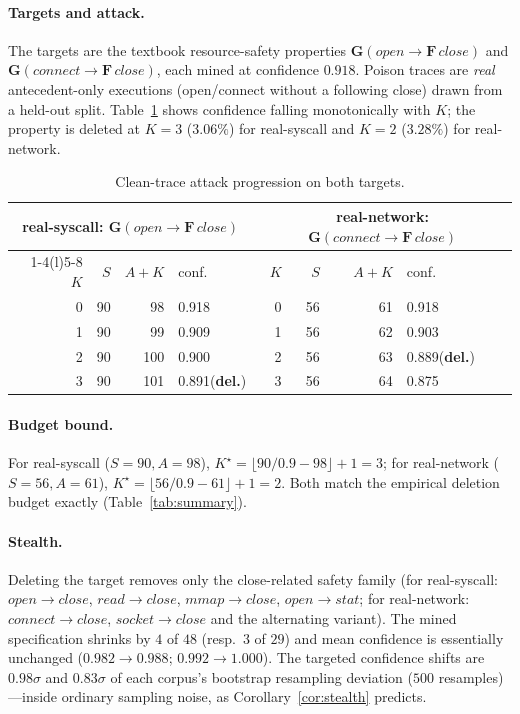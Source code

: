 \documentclass[runningheads]{llncs}
\begin{document}
\paragraph{Targets and attack.} The targets are the textbook resource-safety
properties $\mathbf{G}(\mathit{open}\!\rightarrow\!\mathbf{F}\,\mathit{close})$
and $\mathbf{G}(\mathit{connect}\!\rightarrow\!\mathbf{F}\,\mathit{close})$, each
mined at confidence $0.918$. Poison traces are \emph{real} antecedent-only
executions (open/connect without a following close) drawn from a held-out split.
Table~\ref{tab:attack} shows confidence falling monotonically with $K$; the
property is deleted at $K{=}3$ ($3.06\%$) for real-syscall and $K{=}2$ ($3.28\%$)
for real-network.

\begin{table}[t]
\centering
\caption{Clean-trace attack progression on both targets.}
\label{tab:attack}
\begin{tabular}{rrrl@{\qquad}rrrl}
\toprule
\multicolumn{4}{c}{real-syscall: $\mathbf{G}(\mathit{open}\!\to\!\mathbf{F}\,\mathit{close})$}
& \multicolumn{4}{c}{real-network: $\mathbf{G}(\mathit{connect}\!\to\!\mathbf{F}\,\mathit{close})$}\\
\cmidrule(r){1-4}\cmidrule(l){5-8}
$K$ & $S$ & $A{+}K$ & conf. & $K$ & $S$ & $A{+}K$ & conf. \\
\midrule
0 & 90 & 98  & 0.918 & 0 & 56 & 61 & 0.918 \\
1 & 90 & 99  & 0.909 & 1 & 56 & 62 & 0.903 \\
2 & 90 & 100 & 0.900 & 2 & 56 & 63 & 0.889\;(\textbf{del.}) \\
3 & 90 & 101 & 0.891\;(\textbf{del.}) & 3 & 56 & 64 & 0.875 \\
\bottomrule
\end{tabular}
\end{table}

\paragraph{Budget bound.} For real-syscall ($S{=}90,A{=}98$),
$K^\star=\lfloor 90/0.9-98\rfloor+1=3$; for real-network ($S{=}56,A{=}61$),
$K^\star=\lfloor 56/0.9-61\rfloor+1=2$. Both match the empirical deletion budget
exactly (Table~\ref{tab:summary}).

\paragraph{Stealth.} Deleting the target removes only the close-related safety
family (for real-syscall: $\mathit{open}{\to}\mathit{close}$,
$\mathit{read}{\to}\mathit{close}$, $\mathit{mmap}{\to}\mathit{close}$,
$\mathit{open}{\to}\mathit{stat}$; for real-network:
$\mathit{connect}{\to}\mathit{close}$, $\mathit{socket}{\to}\mathit{close}$ and
the alternating variant). The mined specification shrinks by $4$ of $48$
(resp.\ $3$ of $29$) and mean confidence is essentially unchanged
($0.982\!\to\!0.988$; $0.992\!\to\!1.000$). The targeted confidence shifts are
$0.98\sigma$ and $0.83\sigma$ of each corpus's bootstrap resampling deviation
($500$ resamples)---inside ordinary sampling noise, as
Corollary~\ref{cor:stealth} predicts.
\end{document}

